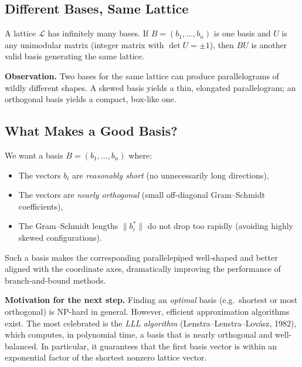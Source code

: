 \documentclass[11pt]{article}
\theoremstyle{plain}
\theoremstyle{definition}
\begin{document}
\subsection{Different Bases, Same Lattice}

A lattice $\mathcal{L}$ has infinitely many bases. If $B = (b_1, \ldots, b_n)$
is one basis and $U$ is any unimodular matrix (integer matrix with $\det U = \pm 1$),
then $BU$ is another valid basis generating the same lattice.

\begin{keybox}
\textbf{Observation.}
Two bases for the same lattice can produce parallelograms of wildly different
shapes. A skewed basis yields a thin, elongated parallelogram; an orthogonal
basis yields a compact, box-like one.
\end{keybox}

\subsection{What Makes a Good Basis?}

We want a basis $B = (b_1, \ldots, b_n)$ where:
\begin{itemize}
  \item The vectors $b_i$ are \emph{reasonably short} (no unnecessarily long directions),
  \item The vectors are \emph{nearly orthogonal} (small off-diagonal
        Gram--Schmidt coefficients),
  \item The Gram--Schmidt lengths $\|b_i^*\|$ do not drop too rapidly
        (avoiding highly skewed configurations).
\end{itemize}

Such a basis makes the corresponding parallelepiped well-shaped and
better aligned with the coordinate axes, dramatically improving the
performance of branch-and-bound methods.

\begin{keybox}
\textbf{Motivation for the next step.}
Finding an \emph{optimal} basis (e.g.\ shortest or most orthogonal) is
NP-hard in general. However, efficient approximation algorithms exist.
The most celebrated is the \emph{LLL algorithm} (Lenstra--Lenstra--Lov\'{a}sz, 1982),
which computes, in polynomial time, a basis that is nearly orthogonal and
well-balanced. In particular, it guarantees that the first basis vector is
within an exponential factor of the shortest nonzero lattice vector.
\end{keybox}
\end{document}
